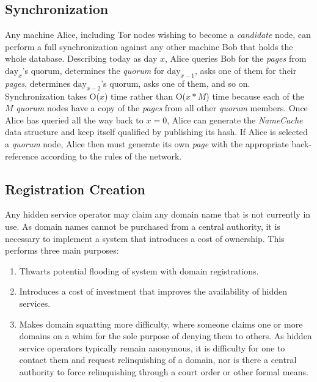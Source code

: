 \subsection{Synchronization}


Any machine Alice, including Tor nodes wishing to become a \emph{candidate} node, can perform a full synchronization against any other machine Bob that holds the whole database. Describing today as day $ x $, Alice queries Bob for the \emph{pages} from $ \textrm{day}_{x} $'s quorum, determines the \emph{quorum} for $ \textrm{day}_{x-1} $, asks one of them for their \emph{pages}, determines $ \textrm{day}_{x-2} $'s quorum, asks one of them, and so on. Synchronization takes O($ x $) time rather than O($ x * M $) time because each of the $ M $ \emph{quorum} nodes have a copy of the \emph{pages} from all other \emph{quorum} members. Once Alice has queried all the way back to $ x = 0 $, Alice can generate the \emph{NameCache} data structure and keep itself qualified by publishing its hash. If Alice is selected a \emph{quorum} node, Alice then must generate its own \emph{page} with the appropriate back-reference according to the rules of the network.

\subsection{Registration Creation}

Any hidden service operator may claim any domain name that is not currently in use. As domain names cannot be purchased from a central authority, it is necessary to implement a system that introduces a cost of ownership. This performs three main purposes: 

\begin{enumerate}
	\item Thwarts potential flooding of system with domain registrations.
	\item Introduces a cost of investment that improves the availability of hidden services.
	\item Makes domain squatting more difficulty, where someone claims one or more domains on a whim for the sole purpose of denying them to others. As hidden service operators typically remain anonymous, it is difficulty for one to contact them and request relinquishing of a domain, nor is there a central authority to force relinquishing through a court order or other formal means.
\end{enumerate}


